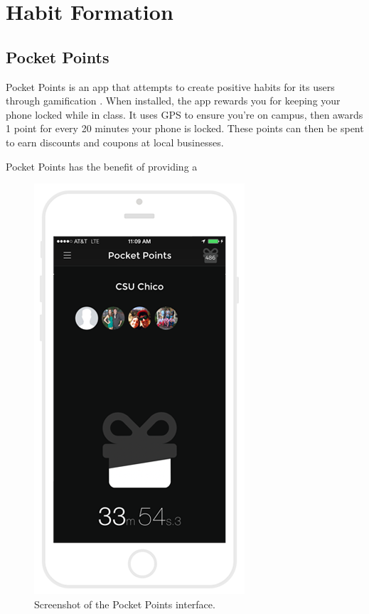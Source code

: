 

\section{Habit Formation}

\subsection{Pocket Points}
\par Pocket Points is an app that attempts to create positive habits for its users through gamification \cite{pocketpoints}. When installed, the app rewards you for keeping your phone locked while in class. It uses GPS to ensure you're on campus, then awards 1 point for every 20 minutes your phone is locked. These points can then be spent to earn discounts and coupons at local businesses.

\par Pocket Points has the benefit of providing a 


\begin{figure}
	\centering
	\includegraphics[width=0.7\linewidth]{figures/pocket-points}
	\caption[Memrise]{Screenshot of the Pocket Points interface. }
	\label{fig:pocket-points}
\end{figure}


